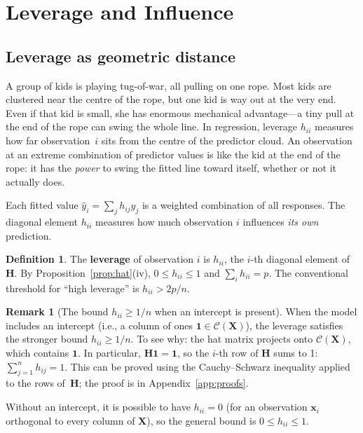 \documentclass[11pt,a4paper]{article}
\theoremstyle{plain}
\theoremstyle{definition}
\newtheorem{definition}[theorem]{Definition}
\newtheorem{remark}[theorem]{Remark}
\newcommand{\bX}{\bm{X}}
\newcommand{\bH}{\bm{H}}
\newcommand{\Col}{\mathcal{C}}
\begin{document}
\section{Leverage and Influence}\label{sec:leverage}

\subsection{Leverage as geometric distance}

\begin{toystory}
A group of kids is playing tug-of-war, all pulling on one rope.  Most
kids are clustered near the centre of the rope, but one kid is way out
at the very end.  Even if that kid is small, she has enormous mechanical
advantage---a tiny pull at the end of the rope can swing the whole line.
In regression, leverage $h_{ii}$ measures how far observation~$i$ sits
from the centre of the predictor cloud.  An observation at an extreme
combination of predictor values is like the kid at the end of the rope:
it has the \emph{power} to swing the fitted line toward itself, whether
or not it actually does.
\end{toystory}

Each fitted value $\hat{y}_i = \sum_j h_{ij}y_j$ is a weighted
combination of all responses. The diagonal element $h_{ii}$
measures how much observation $i$ influences \emph{its own} prediction.

\begin{definition}
The \textbf{leverage} of observation $i$ is $h_{ii}$, the $i$-th diagonal
element of $\bH$. By Proposition~\ref{prop:hat}(iv),
$0 \le h_{ii} \le 1$ and $\sum_i h_{ii} = p$.
The conventional threshold for ``high leverage'' is $h_{ii} > 2p/n$.
\end{definition}

\begin{remark}[The bound $h_{ii}\ge 1/n$ when an intercept is present]\label{rem:hii-intercept}
When the model includes an intercept (i.e., a column of ones $\bm{1}\in\Col(\bX)$),
the leverage satisfies the stronger bound $h_{ii}\ge 1/n$.
To see why: the hat matrix projects onto $\Col(\bX)$, which contains $\bm{1}$.
In particular, $\bH\bm{1} = \bm{1}$, so the $i$-th row of $\bH$ sums to 1:
$\sum_{j=1}^n h_{ij} = 1$.
This can be proved using the Cauchy--Schwarz inequality applied to the
rows of~$\bH$; the proof is in Appendix~\ref{app:proofs}.

Without an intercept, it is possible to have $h_{ii} = 0$ (for an observation
$\bm{x}_i$ orthogonal to every column of $\bX$), so the general bound is
$0 \le h_{ii} \le 1$.
\end{remark}
\end{document}
